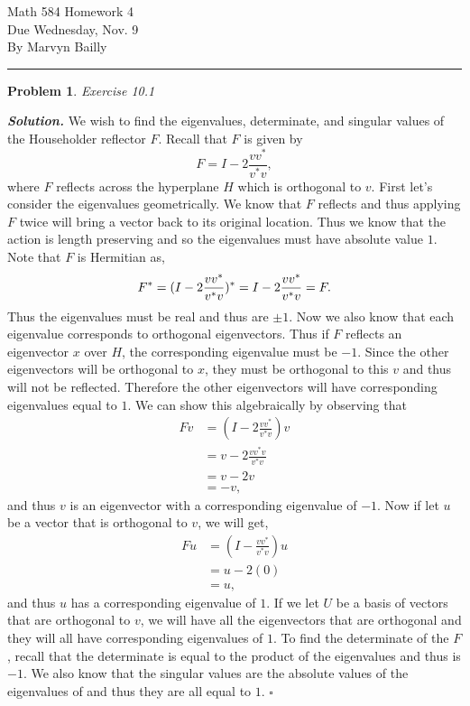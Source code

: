 \documentclass[12pt]{report}
\newtheorem{problem}{Problem}
\newenvironment{solution}[1][\it{Solution}]{\textbf{#1. } }{$\square$}
\begin{document}
\large

\begin{center}
 Math 584 Homework 4\\
 Due Wednesday, Nov. 9\\
 By Marvyn Bailly\\
\end{center}

\normalsize

\hrule



\begin{problem}
    Exercise 10.1
\end{problem}

\begin{solution}
    \noindent
    We wish to find the eigenvalues, determinate, and singular values of the Householder reflector $F$. Recall that $F$ is given by
    \[ F = I - 2 \frac{vv^*}{v^*v}, \]
    where $F$ reflects across the hyperplane $H$ which is orthogonal to $v$. First let's consider the eigenvalues geometrically. We know that $F$ reflects and thus applying $F$ twice will bring a vector back to its original location. Thus we know that the action is length preserving and so the eigenvalues must have absolute value $1$. Note that $F$ is Hermitian as,
    \[
        F^* = (I - 2 \frac{vv^*}{v^*v})^* = I - 2\frac{vv^*}{v^*v} = F.\\
    \]
    Thus the eigenvalues must be real and thus are $\pm 1$. Now we also know that each eigenvalue corresponds to orthogonal eigenvectors. Thus if $F$ reflects an eigenvector $x$ over $H$, the corresponding eigenvalue must be $-1$. Since the other eigenvectors will be orthogonal to $x$, they must be orthogonal to this $v$ and thus will not be reflected. Therefore the other eigenvectors will have corresponding eigenvalues equal to $1$. We can show this algebraically by observing that
    \begin{align*}
        Fv &= (I - 2\frac{vv^*}{v^*v})v\\
        &= v - 2\frac{vv^*v}{v^*v}\\
        &= v - 2v\\
        &= -v,
    \end{align*}
    and thus $v$ is an eigenvector with a corresponding eigenvalue of $-1$. Now if let $u$ be a vector that is orthogonal to $v$, we will get,
    \begin{align*}
        Fu &= (I - \frac{vv^*}{v^*v})u\\
        &= u - 2(0)\\
        &= u,
    \end{align*}
    and thus $u$ has a corresponding eigenvalue of $1$. If we let $U$ be a basis of vectors that are orthogonal to $v$, we will have all the eigenvectors that are orthogonal and they will all have corresponding eigenvalues of $1$. To find the determinate of the $F$, recall that the determinate is equal to the product of the eigenvalues and thus is $-1$. We also know that the singular values are the absolute values of the eigenvalues of and thus they are all equal to $1$. 
\end{solution}
\end{document}
